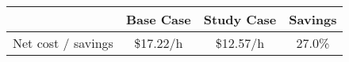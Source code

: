 \begin{tabular}{|l|c|c|c|}
\hline
 & Base Case & Study Case & Savings \\ \hline
Net cost / savings & \$17.22/h & \$12.57/h & 27.0\%
\\ \hline
\end{tabular}

